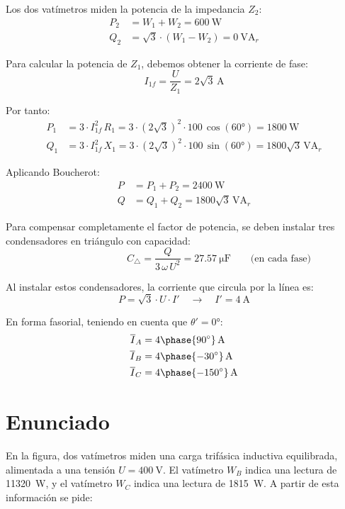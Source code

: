 Los dos vatímetros miden la potencia de la impedancia $Z_2$:
\begin{align*}
  P_2 &= W_1 + W_2 = \SI{600}{\watt}\\
  Q_2 &= \sqrt{3}\cdot (W_1 - W_2) = \SI{0}{\volt\ampere_r}
\end{align*}

Para calcular la potencia de $Z_1$, debemos obtener la corriente de fase:
\[
  I_{1f} = \frac{U}{Z_1} = {2\sqrt{3}}\,\unit{\ampere}
\]

Por tanto:
\begin{align*}
  P_1 &= 3 \cdot I_{1f}^2 \, R_1 = 3 \cdot (2\sqrt{3})^2 \cdot 100\, \cos(\ang{60}) = \SI{1800}{\watt}\\
  Q_1 &= 3 \cdot I_{1f}^2 \, X_1 = 3 \cdot (2\sqrt{3})^2 \cdot 100\, \sin(\ang{60}) = {1800\sqrt{3}}\,\unit{\volt\ampere_r}
\end{align*}

Aplicando Boucherot:
\begin{align*}
  P &= P_1 + P_2 = \SI{2400}{\watt}\\
  Q &= Q_1 + Q_2 = {1800\sqrt{3}}\,\unit{\volt\ampere_r}
\end{align*}

Para compensar completamente el factor de potencia, se deben instalar tres condensadores en triángulo con capacidad:
\[
  \qquad\qquad\qquad\quad C_\triangle = \frac{Q}{3 \, \omega \, U^2} = \SI{27.57}{\micro\farad} \qquad \text{(en cada fase)}
\]

\vspace{2mm}
Al instalar estos condensadores, la corriente que circula por la línea es:
\[
  P = \sqrt{3} \cdot U \cdot I' \quad \rightarrow \quad I' = \SI{4}{\ampere}
\]

En forma fasorial, teniendo en cuenta que $\theta' = \ang{0}$:
\begin{align*}
  \overline{I}_A &= {4\phase{\ang{90}}}\,\unit{\ampere}\\
  \overline{I}_B &= {4\phase{\ang{-30}}}\,\unit{\ampere}\\
  \overline{I}_C &= {4\phase{\ang{-150}}}\,\unit{\ampere}
\end{align*}





\section{Enunciado}

En la figura, dos vatímetros miden una carga trifásica inductiva
equilibrada, alimentada a una tensión $U = \SI{400}{\volt}$. El
vatímetro $W_B$ indica una lectura de \SI{11320}{\watt}, y el
vatímetro $W_C$ indica una lectura de \SI{1815}{\watt}. A partir de
esta información se pide:

